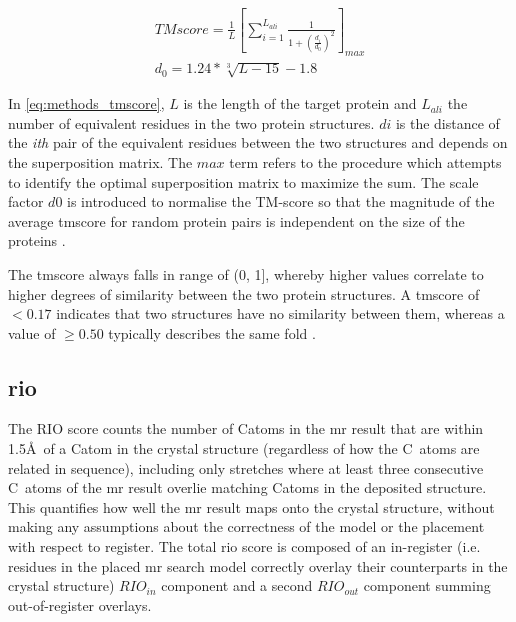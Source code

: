 \begin{align*}
TMscore=\frac{1}{L}\left [ \sum_{i=1}^{L_{ali}}\frac{1}{1+\left (\frac{d_i}{d_0}\right )^2}\right ]_{max}\label{eq:methods_tmscore} \\
d_0=1.24*\sqrt[3]{L-15}-1.8
\end{align*}

In \cref{eq:methods_tmscore}, $L$ is the length of the target protein and $L_{ali}$ the number of equivalent residues in the two protein structures. $di$ is the distance of the \textit{ith} pair of the equivalent residues between the two structures and depends on the superposition matrix. The $max$ term refers to the procedure which attempts to identify the optimal superposition matrix to maximize the sum. The scale factor $d0$ is introduced to normalise the TM-score so that the magnitude of the average \gls{tmscore} for random protein pairs is independent on the size of the proteins \cite{Zhang2005-hx}.

The \gls{tmscore} always falls in range of (0, 1], whereby higher values correlate to higher degrees of similarity between the two protein structures. A \gls{tmscore} of $<0.17$ indicates that two structures have no similarity between them, whereas a value of $\geq0.50$ typically describes the same fold \cite{Xu2010-sw}.

\subsection{\acrlong{rio}} \label{sec:methods_rio}
The RIO score counts the number of C\textalpha atoms in the \gls{mr} result that are within 1.5\AA\ of a C\textalpha atom in the crystal structure (regardless of how the C\textalpha\ atoms are related in sequence), including only stretches where at least three consecutive C\textalpha\ atoms of the \gls{mr} result overlie matching C\textalpha atoms in the deposited structure. This quantifies how well the \gls{mr} result maps onto the crystal structure, without making any assumptions about the correctness of the model or the placement with respect to register. The total \gls{rio} score is composed of an in-register (i.e. residues in the placed \gls{mr} search model correctly overlay their counterparts in the crystal structure) $RIO_{in}$ component and a second $RIO_{out}$ component summing out-of-register overlays.
